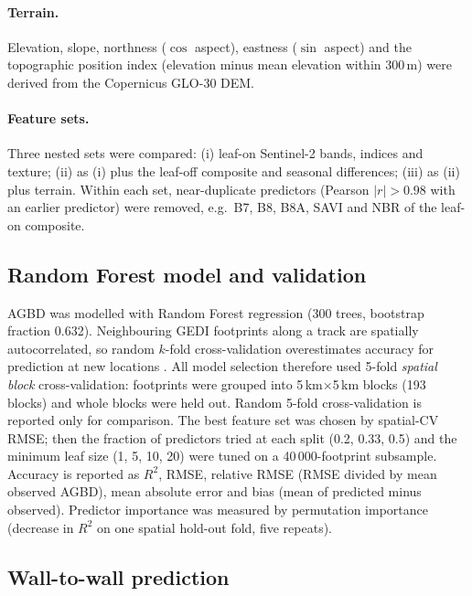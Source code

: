 \documentclass[11pt,a4paper]{article}
\newcommand{\rsq}{$R^2$}
\begin{document}
\paragraph{Terrain.} Elevation, slope, northness ($\cos$ aspect), eastness ($\sin$ aspect)
and the topographic position index (elevation minus mean elevation within 300\,m) were
derived from the Copernicus GLO-30 DEM.

\paragraph{Feature sets.} Three nested sets were compared: (i) leaf-on Sentinel-2 bands,
indices and texture; (ii) as (i) plus the leaf-off composite and seasonal differences;
(iii) as (ii) plus terrain. Within each set, near-duplicate predictors (Pearson
$|r| > 0.98$ with an earlier predictor) were removed, e.g.\ B7, B8, B8A, SAVI and NBR of the
leaf-on composite.

\subsection{Random Forest model and validation}

AGBD was modelled with Random Forest regression \citep{breiman2001} (300 trees, bootstrap
fraction 0.632). Neighbouring GEDI footprints along a track are spatially autocorrelated, so
random $k$-fold cross-validation overestimates accuracy for prediction at new locations
\citep{roberts2017, ploton2020}. All model selection therefore used 5-fold \emph{spatial block}
cross-validation: footprints were grouped into 5\,km$\times$5\,km blocks (193 blocks) and
whole blocks were held out. Random 5-fold cross-validation is reported only for comparison.
The best feature set was chosen by spatial-CV RMSE; then the fraction of predictors tried at
each split (0.2, 0.33, 0.5) and the minimum leaf size (1, 5, 10, 20) were tuned on a
40\,000-footprint subsample. Accuracy is reported as \rsq{}, RMSE, relative RMSE (RMSE divided
by mean observed AGBD), mean absolute error and bias (mean of predicted minus observed).
Predictor importance was measured by permutation importance (decrease in \rsq{} on one
spatial hold-out fold, five repeats).

\subsection{Wall-to-wall prediction}
\end{document}
